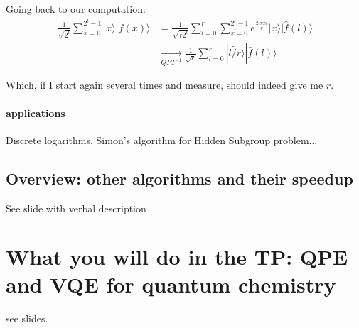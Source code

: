 \documentclass{article}
\begin{document}
Going back to our computation:
\begin{align*}
\frac{1}{\sqrt{2^t}}\sum_{x=0}^{2^t-1} |x\rangle|f(x)\rangle &= 
    \frac{1}{\sqrt{r 2^t}}\sum_{l=0}^{r}\sum_{x=0}^{2^t-1}e^{\frac{2i\pi x l}{r}} |x\rangle|\hat{f}(l)\rangle\\
    &\xrightarrow[QFT^{-1}]{} \frac{1}{\sqrt{r}} \sum_{l=0}^{r} |\tilde{l/r}\rangle|\hat{f}(l)\rangle
\end{align*}

Which, if I start again several times and measure, should indeed give me $r$.

\paragraph{applications} Discrete logarithms, Simon's algorithm for 
Hidden Subgroup problem...

\subsection{Overview: other algorithms and their speedup}
See slide with verbal description


\section{What you will do in the TP: QPE and VQE for quantum chemistry}
see slides.
\end{document}
